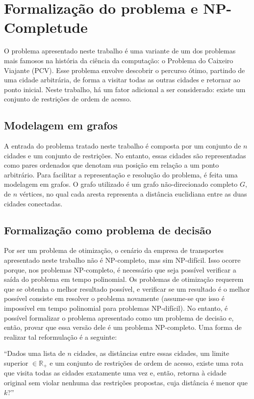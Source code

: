 \documentclass[10pt,a4paper]{article}
\numberwithin{equation}{section}
\begin{document}
\section{Formalização do problema e NP-Completude}

O problema apresentado neste trabalho é uma variante de um dos problemas mais famosos na história da ciência da computação: o Problema do Caixeiro Viajante (PCV). Esse problema envolve descobrir o percurso ótimo, partindo de uma cidade arbitrária, de forma a visitar todas as outras cidades e retornar ao ponto inicial. Neste trabalho, há um fator adicional a ser considerado: existe um conjunto de restrições de ordem de acesso.

\subsection{Modelagem em grafos}

A entrada do problema tratado neste trabalho é composta por um conjunto de $n$ cidades e um conjunto de restrições. No entanto, essas cidades são representadas como pares ordenados que denotam sua posição em relação a um ponto arbitrário. Para facilitar a representação e resolução do problema, é feita uma modelagem em grafos. O grafo utilizado é um grafo não-direcionado completo $G$, de $n$ vértices, no qual cada aresta representa a distância euclidiana entre as duas cidades conectadas.


\subsection{Formalização como problema de decisão}

Por ser um problema de otimização, o cenário da empresa de transportes apresentado neste trabalho não é NP-completo, mas sim NP-difícil. Isso ocorre porque, nos problemas NP-completo, é necessário que seja possível verificar a saída do problema em tempo polinomial. Os problemas de otimização requerem que se obtenha o melhor resultado possível, e verificar se um resultado é o melhor possível consiste em resolver o problema novamente (assume-se que isso é impossível em tempo polinomial para problemas NP-difícil). No entanto, é possível formalizar o problema apresentado como um problema de decisão e, então, provar que essa versão dele é um problema NP-completo. Uma forma de realizar tal reformulação é a seguinte:

``Dados uma lista de $n$ cidades, as distâncias entre essas cidades, um limite superior $\in \mathbb{R}_{+}$ e um conjunto de restrições de ordem de acesso, existe uma rota que visita todas as cidades exatamente uma vez e, então, retorna à cidade original sem violar nenhuma das restrições propostas, cuja distância é menor que $k$?''
\end{document}
